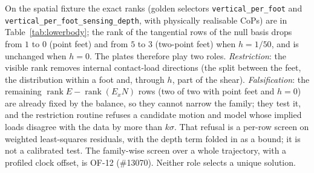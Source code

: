 \documentclass[11pt,a4paper]{article}
\newcommand{\rank}{\operatorname{rank}}
\begin{document}
On the spatial fixture the exact ranks (golden selectors
\texttt{vertical\_per\_foot} and \texttt{vertical\_per\_foot\_sensing\_depth},
with physically realisable CoPs) are in Table~\ref{tab:lowerbody}; the rank of
the tangential rows of the null basis drops from $1$ to $0$ (point feet) and
from $5$ to $3$ (two-point feet) when $h=1/50$, and is unchanged when $h=0$.
The plates therefore play two roles.  \emph{Restriction}: the visible rank
removes internal contact-load directions (the split between the feet, the
distribution within a foot and, through $h$, part of the shear).
\emph{Falsification}: the remaining
$\rank E-\rank(E_xN)$ rows (two of two with point feet and $h=0$) are already
fixed by the balance, so they cannot narrow the family; they test it, and the
restriction routine refuses a candidate motion and model whose implied loads
disagree with the data by more than $k\sigma$.  That refusal is a per-row
screen on weighted least-squares residuals, with the depth term folded in as a
bound; it is not a calibrated test.  The family-wise screen over a whole
trajectory, with a profiled clock offset, is OF-12 (\#13070).  Neither role
selects a unique solution.
\end{document}

